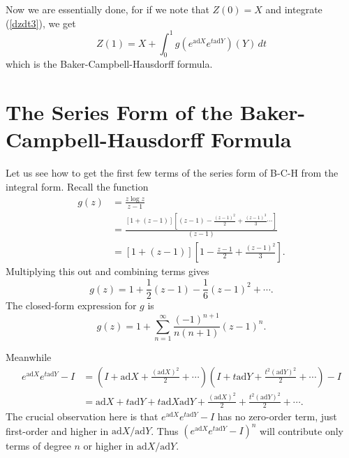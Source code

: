 \documentclass{amsbook}
\theoremstyle{plain}
\numberwithin{equation}{chapter}
\numberwithin{theorem}{chapter}
\begin{document}
Now we are essentially done, for if we note that $Z(0)=X$ and integrate
(\ref{dzdt3}), we get
\[
Z(1)=X+\int_{0}^{1}g(e^{\mathrm{ad}X}e^{t\mathrm{ad}Y})(Y)\,dt
\]
which is the Baker-Campbell-Hausdorff formula.

\section{The Series Form of the Baker-Campbell-Hausdorff
Formula\label{series.section}}

Let us see how to get the first few terms of the series form of B-C-H from the
integral form. Recall the function
\begin{align*}
g\left(  z\right)   & =\frac{z\log z}{z-1}\\
& =\frac{\left[  1+\left(  z-1\right)  \right]  \left[  \left(  z-1\right)
-\frac{\left(  z-1\right)  ^{2}}2+\frac{\left(  z-1\right)  ^{3}}%
3\cdots\right]  }{\left(  z-1\right)  }\\
& =\left[  1+\left(  z-1\right)  \right]  \left[  1-\frac{z-1}2+\frac{\left(
z-1\right)  ^{2}}3\right]  \text{.}%
\end{align*}
Multiplying this out and combining terms gives
\[
g\left(  z\right)  =1+\frac12\left(  z-1\right)  -\frac16\left(  z-1\right)
^{2}+\cdots\text{.}%
\]
The closed-form expression for $g$ is
\[
g\left(  z\right)  =1+\sum_{n=1}^{\infty}\frac{\left(  -1\right)  ^{n+1}%
}{n\left(  n+1\right)  }\left(  z-1\right)  ^{n}\text{.}%
\]

Meanwhile
\begin{align*}
e^{\mathrm{ad}X}e^{t\mathrm{ad}Y}-I  & =\left(  I+\mathrm{ad}X+\frac{\left(
\mathrm{ad}X\right)  ^{2}}2+\cdots\right)  \left(  I+t\mathrm{ad}Y+\frac
{t^{2}\left(  \mathrm{ad}Y\right)  ^{2}}2+\cdots\right)  -I\\
& =\mathrm{ad}X+t\mathrm{ad}Y+t\mathrm{ad}X\mathrm{ad}Y+\frac{\left(
\mathrm{ad}X\right)  ^{2}}2+\frac{t^{2}\left(  \mathrm{ad}Y\right)  ^{2}%
}2+\cdots\text{.}%
\end{align*}
The crucial observation here is that $e^{\mathrm{ad}X}e^{t\mathrm{ad}Y}-I$ has
no zero-order term, just first-order and higher in $\mathrm{ad}X/\mathrm{ad}%
Y$. Thus $\left(  e^{\mathrm{ad}X}e^{t\mathrm{ad}Y}-I\right)  ^{n}$ will
contribute only terms of degree $n$ or higher in $\mathrm{ad}X/\mathrm{ad}Y$.
\end{document}
